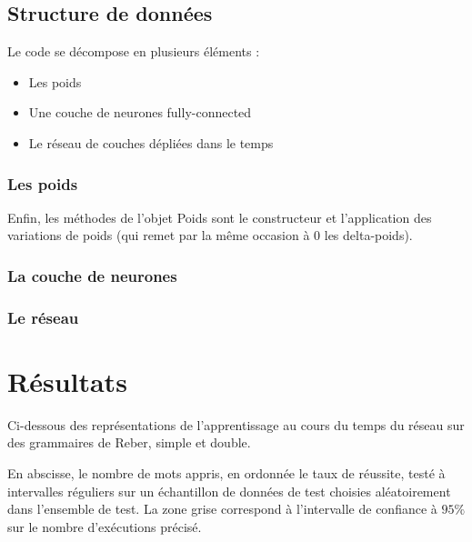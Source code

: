 \bigskip

\subsection{Structure de données}

Le code se décompose en plusieurs éléments :
\begin{itemize}
  \item Les poids
  \item Une couche de neurones fully-connected
  \item Le réseau de couches dépliées dans le temps
\end{itemize}

\subsubsection{Les poids}


Enfin, les méthodes de l'objet Poids sont le constructeur et
l'application des variations de poids (qui remet par la même occasion à 0
les delta-poids).

\subsubsection{La couche de neurones}


\subsubsection{Le réseau}


\section{Résultats}
Ci-dessous des représentations de l'apprentissage au cours du temps du réseau sur des
grammaires de Reber, simple et double.

\smallskip

En abscisse, le nombre de mots appris, en ordonnée le taux de réussite, testé à
intervalles réguliers sur un échantillon de données de test choisies aléatoirement
dans l'ensemble de test. La zone grise correspond à l'intervalle de confiance à
$95\%$ sur le nombre d'exécutions précisé.

\smallskip

